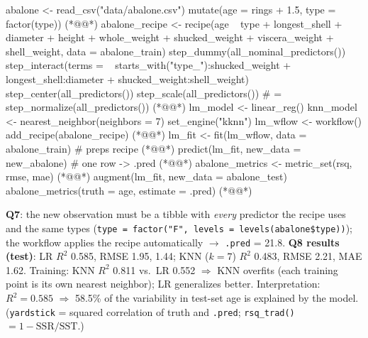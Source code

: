 \begin{keybox}
\begin{rcode}
abalone <- read_csv("data/abalone.csv") %
  mutate(age = rings + 1.5, type = factor(type))  (*@@*)
abalone_recipe <- recipe(age ~ type + longest_shell + diameter +
    height + whole_weight + shucked_weight + viscera_weight +
    shell_weight, data = abalone_train) %
  step_dummy(all_nominal_predictors()) %
  step_interact(terms = ~ starts_with("type_"):shucked_weight +
     longest_shell:diameter + shucked_weight:shell_weight) %
  step_center(all_predictors()) %
  step_scale(all_predictors())   # = step_normalize(all_predictors())  (*@@*)
lm_model  <- linear_reg() %
knn_model <- nearest_neighbor(neighbors = 7) %
  set_engine("kknn") %
lm_wflow <- workflow() %
  add_recipe(abalone_recipe)                        (*@@*)
lm_fit <- fit(lm_wflow, data = abalone_train)  # preps recipe  (*@@*)
predict(lm_fit, new_data = new_abalone)     # one row -> .pred  (*@@*)
abalone_metrics <- metric_set(rsq, rmse, mae)  (*@@*)
augment(lm_fit, new_data = abalone_test) %
  abalone_metrics(truth = age, estimate = .pred)  (*@@*)
\end{rcode}
\textbf{Q7}: the new observation must be a tibble with \emph{every} predictor the recipe uses and the same types (\texttt{type = factor("F", levels = levels(abalone\$type))}); the workflow applies the recipe automatically $\to$ \texttt{.pred} = 21.8.
\textbf{Q8 results (test)}: LR $R^2$ 0.585, RMSE 1.95,  1.44; KNN ($k=7$) $R^2$ 0.483, RMSE 2.21, MAE 1.62. Training: KNN $R^2$ 0.811 vs.\ LR 0.552 $\Rightarrow$ KNN overfits (each training point is its own nearest neighbor); LR generalizes better.
Interpretation: $R^2=0.585$ $\Rightarrow$ 58.5\% of the variability in test-set age is explained by the model. (\texttt{yardstick}  = squared correlation of truth and \texttt{.pred}; \texttt{rsq\_trad()} $=1-\mathrm{SSR}/\mathrm{SST}$.)
\end{keybox}

